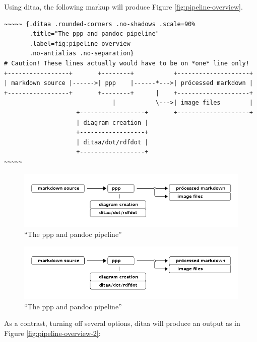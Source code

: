 \documentclass[]{article}
\begin{document}
Using ditaa, the following markup will produce Figure
\ref{fig:pipeline-overview}.

\scriptsize

\begin{verbatim}
~~~~~ {.ditaa .rounded-corners .no-shadows .scale=90%
       .title="The ppp and pandoc pipeline"
       .label=fig:pipeline-overview 
       .no-antialias .no-separation}
# Caution! These lines actually would have to be on *one* line only!
+-----------------+       +--------+           +--------------------+
| markdown source |------>| ppp    |------*--->| pröcessed markdown |
+-----------------+       +--------+      |    +--------------------+
                              |           \--->| image files        |
                    +------------------+       +--------------------+
                    | diagram creation |
                    +------------------+
                    | ditaa/dot/rdfdot |
                    +------------------+
~~~~~
\end{verbatim}

\normalsize

\begin{figure}[htbp]
\centering
\includegraphics{tmp/ppp-render-_6_eB/image-1.png}
\caption{``The ppp and pandoc pipeline''\label{fig:pipeline-overview-x}}
\end{figure}

\begin{figure}[htbp]
\centering
\includegraphics{tmp/ppp-render-_6_eB/image-2.png}
\caption{``The ppp and pandoc pipeline''\label{fig:pipeline-overview-y}}
\end{figure}

As a contrast, turning off several options, ditaa will produce an output
as in Figure \ref{fig:pipeline-overview-2}:
\end{document}
